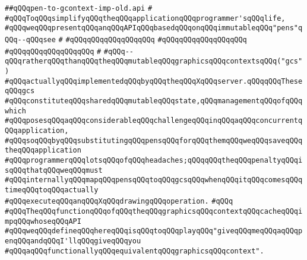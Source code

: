 \label{src/lib/x-kit/xclient/src/window/pen-to-gcontext-imp-old.api}
\verb|##qQQqpen-to-gcontext-imp-old.api|\newline
\verb|#|\newline
\verb|#qQQqToqQQqsimplifyqQQqtheqQQqapplicationqQQqprogrammer'sqQQqlife,|\newline
\verb|#qQQqweqQQqpresentqQQqanqQQqAPIqQQqbasedqQQqonqQQqimmutableqQQq"pens"qQQq--qQQqsee|\newline
\verb|#|\newline
\verb|#qQQqqQQqqQQqqQQqqQQq|\newline
\verb|#qQQqqQQqqQQqqQQqqQQq|\newline
\verb|#qQQqqQQqqQQqqQQqqQQq|\newline
\verb|#|\newline
\verb|#qQQq--qQQqratherqQQqthanqQQqtheqQQqmutableqQQqgraphicsqQQqcontextsqQQq("gcs")|\newline
\verb|#qQQqactuallyqQQqimplementedqQQqbyqQQqtheqQQqXqQQqserver.qQQqqQQqTheseqQQqgcs|\newline
\verb|#qQQqconstituteqQQqsharedqQQqmutableqQQqstate,qQQqmanagementqQQqofqQQqwhich|\newline
\verb|#qQQqposesqQQqaqQQqconsiderableqQQqchallengeqQQqinqQQqaqQQqconcurrentqQQqapplication,|\newline
\verb|#qQQqsoqQQqbyqQQqsubstitutingqQQqpensqQQqforqQQqthemqQQqweqQQqsaveqQQqtheqQQqapplication|\newline
\verb|#qQQqprogrammerqQQqlotsqQQqofqQQqheadaches;qQQqqQQqtheqQQqpenaltyqQQqisqQQqthatqQQqweqQQqmust|\newline
\verb|#qQQqinternallyqQQqmapqQQqpensqQQqtoqQQqgcsqQQqwhenqQQqitqQQqcomesqQQqtimeqQQqtoqQQqactually|\newline
\verb|#qQQqexecuteqQQqanqQQqXqQQqdrawingqQQqoperation.|\newline
\verb|#qQQq|\newline
\verb|#qQQqTheqQQqfunctionqQQqofqQQqtheqQQqgraphicsqQQqcontextqQQqcacheqQQqimpqQQqwhoseqQQqAPI|\newline
\verb|#qQQqweqQQqdefineqQQqhereqQQqisqQQqtoqQQqplayqQQq"giveqQQqmeqQQqaqQQqpenqQQqandqQQqI'llqQQqgiveqQQqyou|\newline
\verb|#qQQqaqQQqfunctionallyqQQqequivalentqQQqgraphicsqQQqcontext".|\newline
